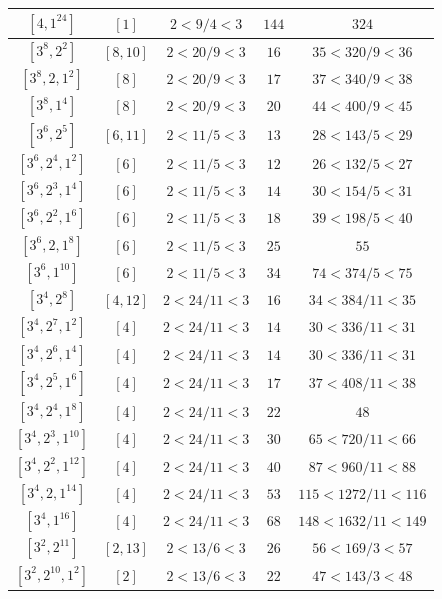 \documentclass{article}%
\begin{document}
\begin{center}
\begin{longtable}{||c|c|c|c|c||}
$[4, 1^{24}]$ & $[1]$ & $2 < 9/4 < 3$ & $144$ & $324$ \\ \hline 
$[3^{8}, 2^{2}]$ & $[8, 10]$ & $2 < 20/9 < 3$ & $16$ & $35 < 320/9 < 36$ \\ \hline 
$[3^{8}, 2, 1^{2}]$ & $[8]$ & $2 < 20/9 < 3$ & $17$ & $37 < 340/9 < 38$ \\ \hline 
$[3^{8}, 1^{4}]$ & $[8]$ & $2 < 20/9 < 3$ & $20$ & $44 < 400/9 < 45$ \\ \hline 
$[3^{6}, 2^{5}]$ & $[6, 11]$ & $2 < 11/5 < 3$ & $13$ & $28 < 143/5 < 29$ \\ \hline 
$[3^{6}, 2^{4}, 1^{2}]$ & $[6]$ & $2 < 11/5 < 3$ & $12$ & $26 < 132/5 < 27$ \\ \hline 
$[3^{6}, 2^{3}, 1^{4}]$ & $[6]$ & $2 < 11/5 < 3$ & $14$ & $30 < 154/5 < 31$ \\ \hline 
$[3^{6}, 2^{2}, 1^{6}]$ & $[6]$ & $2 < 11/5 < 3$ & $18$ & $39 < 198/5 < 40$ \\ \hline 
$[3^{6}, 2, 1^{8}]$ & $[6]$ & $2 < 11/5 < 3$ & $25$ & $55$ \\ \hline 
$[3^{6}, 1^{10}]$ & $[6]$ & $2 < 11/5 < 3$ & $34$ & $74 < 374/5 < 75$ \\ \hline 
$[3^{4}, 2^{8}]$ & $[4, 12]$ & $2 < 24/11 < 3$ & $16$ & $34 < 384/11 < 35$ \\ \hline 
$[3^{4}, 2^{7}, 1^{2}]$ & $[4]$ & $2 < 24/11 < 3$ & $14$ & $30 < 336/11 < 31$ \\ \hline 
$[3^{4}, 2^{6}, 1^{4}]$ & $[4]$ & $2 < 24/11 < 3$ & $14$ & $30 < 336/11 < 31$ \\ \hline 
$[3^{4}, 2^{5}, 1^{6}]$ & $[4]$ & $2 < 24/11 < 3$ & $17$ & $37 < 408/11 < 38$ \\ \hline 
$[3^{4}, 2^{4}, 1^{8}]$ & $[4]$ & $2 < 24/11 < 3$ & $22$ & $48$ \\ \hline 
$[3^{4}, 2^{3}, 1^{10}]$ & $[4]$ & $2 < 24/11 < 3$ & $30$ & $65 < 720/11 < 66$ \\ \hline 
$[3^{4}, 2^{2}, 1^{12}]$ & $[4]$ & $2 < 24/11 < 3$ & $40$ & $87 < 960/11 < 88$ \\ \hline 
$[3^{4}, 2, 1^{14}]$ & $[4]$ & $2 < 24/11 < 3$ & $53$ & $115 < 1272/11 < 116$ \\ \hline 
$[3^{4}, 1^{16}]$ & $[4]$ & $2 < 24/11 < 3$ & $68$ & $148 < 1632/11 < 149$ \\ \hline 
$[3^{2}, 2^{11}]$ & $[2, 13]$ & $2 < 13/6 < 3$ & $26$ & $56 < 169/3 < 57$ \\ \hline 
$[3^{2}, 2^{10}, 1^{2}]$ & $[2]$ & $2 < 13/6 < 3$ & $22$ & $47 < 143/3 < 48$ \\ \hline 

\end{longtable}
\end{center}
\end{document}
